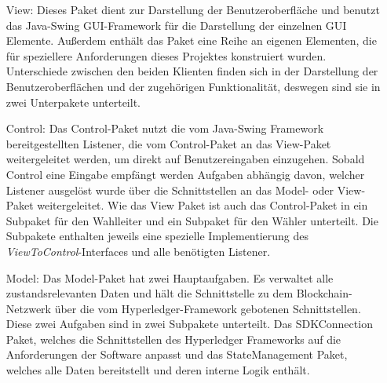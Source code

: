 \documentclass[parskip=full]{scrartcl}
\newcommand{\textitx}[1]{\mbox{\textit{#1}}}
\begin{document}
	\begin{itemize}
		\item[View:] Dieses Paket dient zur Darstellung der Benutzeroberfläche und benutzt das Java-Swing GUI-Framework für die Darstellung der einzelnen GUI Elemente. Außerdem enthält das Paket eine Reihe an eigenen Elementen, die für speziellere Anforderungen dieses Projektes konstruiert wurden. Unterschiede zwischen den beiden Klienten finden sich in der Darstellung der Benutzeroberflächen und der zugehörigen Funktionalität, deswegen sind sie in zwei Unterpakete unterteilt.
		\item[Control:] Das Control-Paket nutzt die vom Java-Swing Framework bereitgestellten Listener, die vom Control-Paket an das View-Paket weitergeleitet werden, um direkt auf Benutzereingaben einzugehen. Sobald Control eine Eingabe empfängt werden Aufgaben abhängig davon, welcher Listener ausgelöst wurde über die Schnittstellen an das Model- oder View-Paket weitergeleitet. Wie das View Paket ist auch das Control-Paket in ein Subpaket für den Wahlleiter und ein Subpaket für den Wähler unterteilt. Die Subpakete enthalten jeweils eine spezielle Implementierung des \textitx{ViewToControl}-Interfaces und alle benötigten Listener.
		\item[Model:] Das Model-Paket hat zwei Hauptaufgaben. Es verwaltet alle zustandsrelevanten Daten und hält die Schnittstelle zu dem Blockchain-Netzwerk über die vom Hyperledger-Framework gebotenen Schnittstellen. Diese zwei Aufgaben sind in zwei Subpakete unterteilt. Das SDKConnection Paket, welches die Schnittstellen des Hyperledger Frameworks auf die Anforderungen der Software anpasst und das StateManagement Paket, welches alle Daten bereitstellt und deren interne Logik enthält.   
	\end{itemize} 
\end{document}
